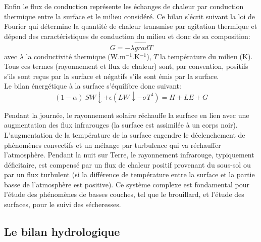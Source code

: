 \noindent Enfin le flux de conduction représente les échanges de chaleur par conduction thermique entre la surface et le milieu considéré. Ce bilan s'écrit suivant la loi de Fourier qui détermine la quantité de chaleur transmise par agitation thermique et dépend des caractéristiques de conduction du milieu et donc de sa composition:
\begin{equation}
G = -\lambda \overset{\rightarrow}{grad}T 
\end{equation}
avec $\lambda$ la conductivité thermique (W.m$^{-1}$.K$^{-1}$), $T$ la température du milieu (K). \\

\noindent Tous ces termes (rayonnement et flux de chaleur) sont, par convention, positifs s'ils sont reçus par la surface et négatifs s'ils sont émis par la surface.\\ 
Le bilan énergétique à la surface s'équilibre donc suivant:
\begin{equation}
(1-\alpha) \: SW\downarrow  + \epsilon(LW\downarrow-\sigma T^{4}) = H + LE + G
\end{equation} 

\noindent Pendant la journée, le rayonnement solaire réchauffe la surface en lien avec une augmentation des flux infrarouges (la surface est assimilée à un corps noir). L'augmentation de la température de la surface engendre le déclenchement de phénomènes convectifs et un mélange par turbulence qui va réchauffer l'atmosphère. Pendant la nuit sur Terre, le rayonnement infrarouge, typiquement déficitaire, est compensé par un flux de chaleur positif provenant du sous-sol ou par un flux turbulent (si la différence de température entre la surface et la partie basse de l'atmosphère est positive). Ce système complexe est fondamental pour l'étude des phénomènes de basses couches, tel que le brouillard, et l'étude des surfaces, pour le suivi des sécheresses.

\subsection{{\selectfont Le bilan hydrologique}}
\label{sec:bilan_hydrologique}

